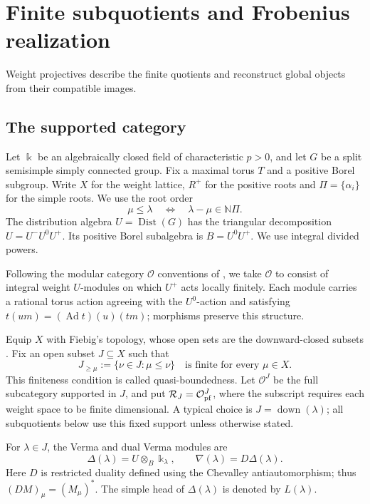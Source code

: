 \documentclass[11pt,reqno]{amsart}
\newcommand{\kk}{\Bbbk}\newcommand{\ZZ}{\mathbb Z}\newcommand{\NN}{\mathbb N}
\newcommand{\OO}{\mathcal O}\newcommand{\CC}{\mathscr C}\newcommand{\RR}{\mathcal R}\newcommand{\DD}{\mathcal D}
\newcommand{\Dist}{\operatorname{Dist}}\newcommand{\Ind}{\operatorname{Ind}}\newcommand{\Perf}{\operatorname{Perf}}
\theoremstyle{definition}
\theoremstyle{remark}
\numberwithin{equation}{section}
\begin{document}
\section{Finite subquotients and Frobenius realization}\label{sec:windows}

Weight projectives describe the finite quotients and reconstruct
global objects from their compatible images.

\subsection{The supported category}
Let $\kk$ be an algebraically closed field of characteristic $p>0$, and
let $G$ be a split semisimple simply connected group. Fix a maximal torus
$T$ and a positive Borel subgroup. Write $X$ for the weight
lattice, $R^+$ for the positive roots and $\Pi=\{\alpha_i\}$ for the
simple roots. We use the root order
\[
 \mu\leq\lambda\quad\Longleftrightarrow\quad
 \lambda-\mu\in\NN\Pi.
\]
The distribution algebra $U=\Dist(G)$ has the triangular decomposition
$U=U^-U^0U^+$. Its positive Borel subalgebra is $B=U^0U^+$.
We use integral divided powers.

Following the modular category $\OO$ conventions of
\cite{Fiebig,Andersen}, we take $\OO$ to consist of integral weight
$U$-modules on which $U^+$ acts locally finitely. Each module carries
a rational torus action agreeing with the $U^0$-action and satisfying
$t(um)=(\operatorname{Ad}t)(u)(tm)$; morphisms preserve this structure.

Equip $X$ with Fiebig's topology, whose open sets are the
downward-closed subsets \cite[Section~10, Definition~3]{Fiebig}.
Fix an open subset $J\subseteq X$ such that
\[
 J_{\geq\mu}:=\{\nu\in J:\mu\leq\nu\}
 \quad\text{is finite for every }\mu\in X.
\]
This finiteness condition is called quasi-boundedness. Let $\OO^J$
be the full subcategory supported in $J$, and put
$\RR_J=\OO^J_{\pf}$, where the subscript requires each weight space
to be finite dimensional. A typical choice is
$J=\operatorname{down}(\lambda)$; all subquotients below use this fixed
support unless otherwise stated.

For $\lambda\in J$, the Verma and dual Verma modules are
\[
 \Delta(\lambda)=U\otimes_B\kk_\lambda,\qquad
 \nabla(\lambda)=D\Delta(\lambda).
\]
Here $D$ is restricted duality defined using the Chevalley
antiautomorphism; thus $(DM)_\mu=(M_\mu)^*$. The simple head of
$\Delta(\lambda)$ is denoted by $L(\lambda)$.
\end{document}
